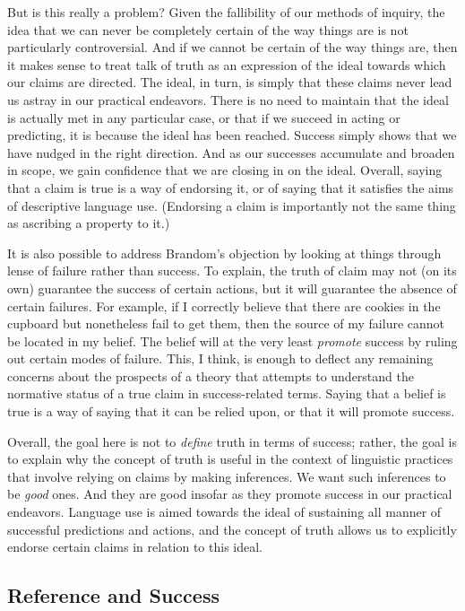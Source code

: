 But is this really a problem? Given the fallibility of our methods of inquiry, the idea that we can never be completely certain of the way things are is not particularly controversial. And if we cannot be certain of the way things are, then it makes sense to treat talk of truth as an expression of the ideal towards which our claims are directed. The ideal, in turn, is simply that these claims never lead us astray in our practical endeavors. There is no need to maintain that the ideal is actually met in any particular case, or that if we succeed in acting or predicting, it is because the ideal has been reached. Success simply shows that we have nudged in the right direction. And as our successes accumulate and broaden in scope, we gain confidence that we are closing in on the ideal. Overall, saying that a claim is true is a way of endorsing it, or of saying that it satisfies the aims of descriptive language use. (Endorsing a claim is importantly not the same thing as ascribing a property to it.) 

It is also possible to address Brandom's objection by looking at things through lense of failure rather than success. To explain, the truth of claim may not (on its own) guarantee the success of certain actions, but it will guarantee the absence of certain failures. For example, if I correctly believe that there are cookies in the cupboard but nonetheless fail to get them, then the source of my failure cannot be located in my belief. The belief will at the very least \textit{promote} success by ruling out certain modes of failure. This, I think, is enough to deflect any remaining concerns about the prospects of a theory that attempts to understand the normative status of a true claim in success-related terms. Saying that a belief is true is a way of saying that it can be relied upon, or that it will promote success.

Overall, the goal here is not to \textit{define} truth in terms of success; rather, the goal is to explain why the concept of truth is useful in the context of linguistic practices that involve relying on claims by making inferences. We want such inferences to be \textit{good} ones. And they are good insofar as they promote success in our practical endeavors. Language use is aimed towards the ideal of sustaining all manner of successful predictions and actions, and the concept of truth allows us to explicitly endorse certain claims in relation to this ideal.

\subsection{Reference and Success}

